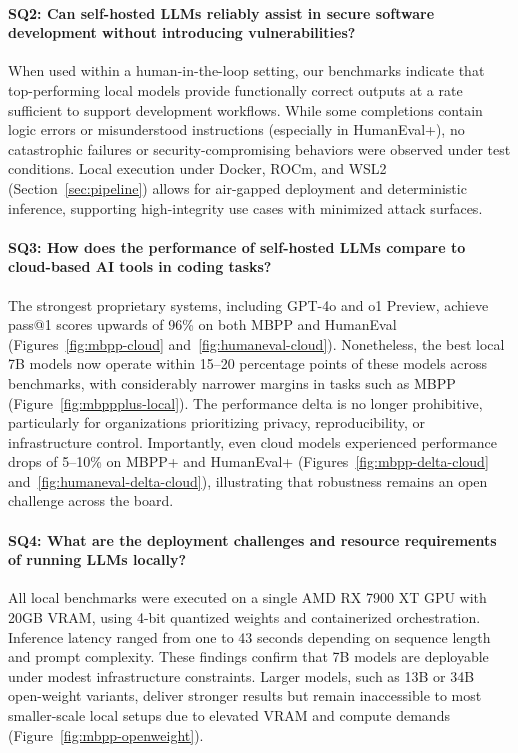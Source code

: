 \paragraph{SQ2: Can self-hosted LLMs reliably assist in secure software development without introducing vulnerabilities?}
When used within a human-in-the-loop setting, our benchmarks indicate that top-performing local models provide functionally correct outputs at a rate sufficient to support development workflows. While some completions contain logic errors or misunderstood instructions (especially in HumanEval+), no catastrophic failures or security-compromising behaviors were observed under test conditions. Local execution under Docker, ROCm, and WSL2 (Section~\ref{sec:pipeline}) allows for air-gapped deployment and deterministic inference, supporting high-integrity use cases with minimized attack surfaces.

\paragraph{SQ3: How does the performance of self-hosted LLMs compare to cloud-based AI tools in coding tasks?}
The strongest proprietary systems, including GPT-4o and o1 Preview, achieve pass@1 scores upwards of 96\% on both \gls{MBPP} and HumanEval (Figures~\ref{fig:mbpp-cloud} and~\ref{fig:humaneval-cloud}). Nonetheless, the best local 7B models now operate within 15--20 percentage points of these models across benchmarks, with considerably narrower margins in tasks such as \gls{MBPP} (Figure~\ref{fig:mbppplus-local}). The performance delta is no longer prohibitive, particularly for organizations prioritizing privacy, reproducibility, or infrastructure control. Importantly, even cloud models experienced performance drops of 5--10\% on \gls{MBPP}+ and HumanEval+ (Figures~\ref{fig:mbpp-delta-cloud} and~\ref{fig:humaneval-delta-cloud}), illustrating that robustness remains an open challenge across the board.

\paragraph{SQ4: What are the deployment challenges and resource requirements of running LLMs locally?}
All local benchmarks were executed on a single AMD RX 7900 XT GPU with 20GB VRAM, using 4-bit quantized weights and containerized orchestration. Inference latency ranged from one to 43 seconds depending on sequence length and prompt complexity. These findings confirm that 7B models are deployable under modest infrastructure constraints. Larger models, such as 13B or 34B open-weight variants, deliver stronger results but remain inaccessible to most smaller-scale local setups due to elevated VRAM and compute demands (Figure~\ref{fig:mbpp-openweight}).


